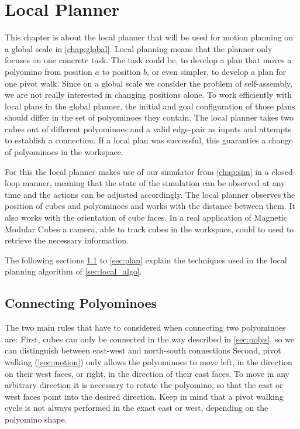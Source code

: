 \chapter{Local Planner}
\label{chap:local}

This chapter is about the local planner that will be used for motion planning on a global scale in \autoref{chap:global}.
Local planning means that the planner only focuses on one concrete task.
The task could be, to develop a plan that moves a polyomino from position $a$ to position $b$, or even simpler, to develop a plan for one pivot walk.
Since on a global scale we consider the problem of self-assembly, we are not really interested in changing positions alone.
To work efficiently with local plans in the global planner, the initial and goal configuration of those plans should differ in the set of polyominoes they contain.
The local planner takes two cubes out of different polyominoes and a valid edge-pair as inputs and attempts to establish a connection.
If a local plan was successful, this guaranties a change of polyominoes in the workspace.

For this the local planner makes use of our simulator from \autoref{chap:sim} in a closed-loop manner, meaning that the state of the simulation can be observed at any time and the actions can be adjusted accordingly.
The local planner observes the position of cubes and polyominoes and works with the distance between them.
It also works with the orientation of cube faces.
In a real application of Magnetic Modular Cubes a camera, able to track cubes in the workspace, could to used to retrieve the necessary information. 

The following sections \ref{sec:connect} to \ref{sec:plan} explain the techniques used in the local planning algorithm of \autoref{sec:local_algo}.

\section{Connecting Polyominoes}
\label{sec:connect}

The two main rules that have to considered when connecting two polyominoes are:
First, cubes can only be connected in the way described in \autoref{sec:polys}, so we can distinguish between east-west and north-south connections
Second, pivot walking (\autoref{sec:motion}) only allows the polyominoes to move left, in the direction on their west faces, or right, in the direction of their east faces.
To move in any arbitrary direction it is necessary to rotate the polyomino, so that the east or west faces point into the desired direction.
Keep in mind that a pivot walking cycle is not always performed in the exact east or west, depending on the polyomino shape.

